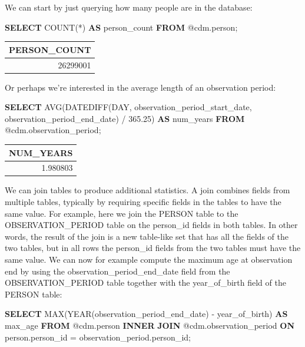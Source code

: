 \documentclass[11pt]{book}
\newenvironment{Shaded}{\begin{snugshade}}{\end{snugshade}}
\newcommand{\KeywordTok}[1]{\textcolor[rgb]{0.13,0.29,0.53}{\textbf{#1}}}
\newcommand{\DataTypeTok}[1]{\textcolor[rgb]{0.13,0.29,0.53}{#1}}
\newcommand{\FloatTok}[1]{\textcolor[rgb]{0.00,0.00,0.81}{#1}}
\newcommand{\FunctionTok}[1]{\textcolor[rgb]{0.00,0.00,0.00}{#1}}
\newcommand{\NormalTok}[1]{#1}
\begin{document}
We can start by just querying how many people are in the database:

\begin{Shaded}
\begin{Highlighting}[]
\KeywordTok{SELECT} \FunctionTok{COUNT}\NormalTok{(*) }\KeywordTok{AS}\NormalTok{ person_count }\KeywordTok{FROM}\NormalTok{ @cdm.person;}
\end{Highlighting}
\end{Shaded}

\begin{longtable}[]{@{}r@{}}
\toprule
PERSON\_COUNT\tabularnewline
\midrule
\endhead
26299001\tabularnewline
\bottomrule
\end{longtable}

Or perhaps we're interested in the average length of an observation
period:

\begin{Shaded}
\begin{Highlighting}[]
\KeywordTok{SELECT} \FunctionTok{AVG}\NormalTok{(DATEDIFF(}\DataTypeTok{DAY}\NormalTok{, }
\NormalTok{                    observation_period_start_date, }
\NormalTok{                    observation_period_end_date) / }\FloatTok{365.25}\NormalTok{) }\KeywordTok{AS}\NormalTok{ num_years}
\KeywordTok{FROM}\NormalTok{ @cdm.observation_period;}
\end{Highlighting}
\end{Shaded}

\begin{longtable}[]{@{}r@{}}
\toprule
NUM\_YEARS\tabularnewline
\midrule
\endhead
1.980803\tabularnewline
\bottomrule
\end{longtable}

We can join tables to produce additional statistics. A join combines
fields from multiple tables, typically by requiring specific fields in
the tables to have the same value. For example, here we join the PERSON
table to the OBSERVATION\_PERIOD table on the person\_id fields in both
tables. In other words, the result of the join is a new table-like set
that has all the fields of the two tables, but in all rows the
person\_id fields from the two tables must have the same value. We can
now for example compute the maximum age at observation end by using the
observation\_period\_end\_date field from the OBSERVATION\_PERIOD table
together with the year\_of\_birth field of the PERSON table:

\begin{Shaded}
\begin{Highlighting}[]
\KeywordTok{SELECT} \FunctionTok{MAX}\NormalTok{(}\DataTypeTok{YEAR}\NormalTok{(observation_period_end_date) -}
\NormalTok{           year_of_birth) }\KeywordTok{AS}\NormalTok{ max_age}
\KeywordTok{FROM}\NormalTok{ @cdm.person}
\KeywordTok{INNER} \KeywordTok{JOIN}\NormalTok{ @cdm.observation_period}
  \KeywordTok{ON}\NormalTok{ person.person_id = observation_period.person_id;}
\end{Highlighting}
\end{Shaded}
\end{document}
